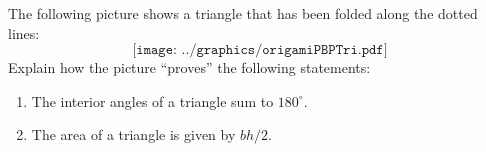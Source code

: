 \begin{prob}
The following picture shows a triangle that has been folded
  along the dotted lines:
\[
\texttt{[image: ../graphics/origamiPBPTri.pdf]}
\]
Explain how the picture ``proves'' the following statements:
\begin{enumerate}
\item The interior angles of a triangle sum to $180^\circ$. 
\item The area of a triangle is given by $bh/2$. 
\end{enumerate}
\end{prob}


%
%

